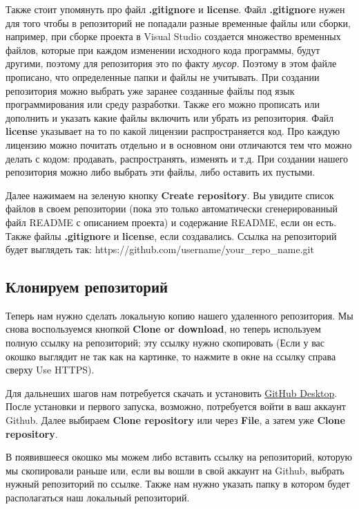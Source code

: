 \documentclass[11pt]{article}
\begin{document}
Также стоит упомянуть про файл \textbf{.gitignore} и \textbf{license}.
Файл \textbf{.gitignore} нужен для того чтобы в репозиторий не попадали
разные временные файлы или сборки, например, при сборке проекта в Visual
Studio создается множество временных файлов, которые при каждом
изменении исходного кода программы, будут другими, поэтому для
репозитория это по факту \emph{мусор}. Поэтому в этом файле прописано,
что определенные папки и файлы не учитывать. При создании репозитория
можно выбрать уже заранее созданные файлы под язык программирования или
среду разработки. Также его можно прописать или дополнить и указать
какие файлы включить или убрать из репозитория. Файл \textbf{license}
указывает на то по какой лицензии распространяется код. Про каждую
лицензию можно почитать отдельно и в основном они отличаются тем что
можно делать с кодом: продавать, распространять, изменять и т.д. При
создании нашего репозитория можно либо выбрать эти файлы, либо оставить
их пустыми.

Далее нажимаем на зеленую кнопку \textbf{Create repository}. Вы увидите
список файлов в своем репозитории (пока это только автоматически
сгенерированный файл README с описанием проекта) и содержание README,
если он есть. Также файлы \textbf{.gitignore} и \textbf{license}, если
создавались. Ссылка на репозиторий будет выглядеть так:
https://github.com/username/your\_repo\_name.git

    \subsection{Клонируем
репозиторий}\label{ux43aux43bux43eux43dux438ux440ux443ux435ux43c-ux440ux435ux43fux43eux437ux438ux442ux43eux440ux438ux439}

Теперь нам нужно сделать локальную копию нашего удаленного репозитория.
Мы снова воспользуемся кнопкой \textbf{Clone or download}, но теперь
используем полную ссылку на репозиторий; эту ссылку нужно скопировать
(Если у вас окошко выглядит не так как на картинке, то нажмите в окне на
ссылку справа сверху Use HTTPS).

Для дальнеших шагов нам потребуется скачать и установить
\href{https://desktop.github.com/}{GitHub Desktop}. После установки и
первого запуска, возможно, потребуется войти в ваш аккаунт Github. Далее
выбираем \textbf{Clone repository} или через \textbf{File}, а затем уже
\textbf{Clone repository}.

    В появившееся окошко мы можем либо вставить ссылку на репозиторий,
которую мы скопировали раньше или, если вы вошли в свой аккаунт на
Github, выбрать нужный репозиторий по ссылке. Также нам нужно указать
папку в котором будет располагаться наш локальный репозиторий.
\end{document}
